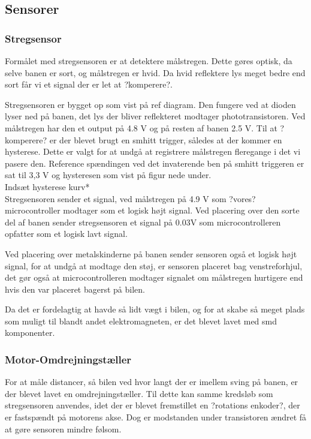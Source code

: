 
\subsection{Sensorer}


\subsubsection{Stregsensor}
Formålet med stregsensoren er at detektere målstregen. Dette gøres optisk, da selve banen er sort, og målstregen er hvid. Da hvid reflektere lys meget bedre end sort får vi et signal der er let at ?komperere?.

Stregsensoren er bygget op som vist på ref diagram. Den fungere ved at dioden lyser ned på banen, det lys der bliver reflekteret modtager phototransistoren. Ved målstregen har den et output på 4.8 V og på resten af banen 2.5 V. Til at ?komperere? er der blevet brugt en smhitt trigger, således at der kommer en hysterese. Dette er valgt for at undgå at registrere målstregen fleregange i det vi pasere den. Reference spændingen ved det invaterende ben på smhitt triggeren er sat til 3,3 V og hysteresen som vist på figur nede under.
\\
Indsæt hysterese kurv*
\\
Stregsensoren sender et signal, ved målstregen på 4.9 V som ?vores? microcontroller modtager som et logisk højt signal. Ved placering over den sorte del af banen sender stregsensoren et signal på 0.03V som microcontrolleren opfatter som et logisk lavt signal. 

Ved placering over metalskinderne på banen sender sensoren også et logisk højt signal, for at undgå at modtage den støj, er sensoren placeret bag venstreforhjul, det gør også at microcontrolleren modtager signalet om målstregen hurtigere end hvis den var placeret bagerst på bilen. 

Da det er fordelagtig at havde så lidt vægt i bilen, og for at skabe så meget plads som muligt til blandt andet elektromagneten, er det blevet lavet med smd komponenter. 


\subsubsection{Motor-Omdrejningstæller}

For at måle distancer, så bilen ved hvor langt der er imellem sving på banen, er der blevet lavet en omdrejningstæller. Til dette kan samme kredsløb som stregsensoren anvendes, idet der er blevet fremstillet en ?rotations enkoder?, der er fastspændt på motorens akse. Dog er modstanden under transistoren ændret få at gøre sensoren mindre følsom.   



